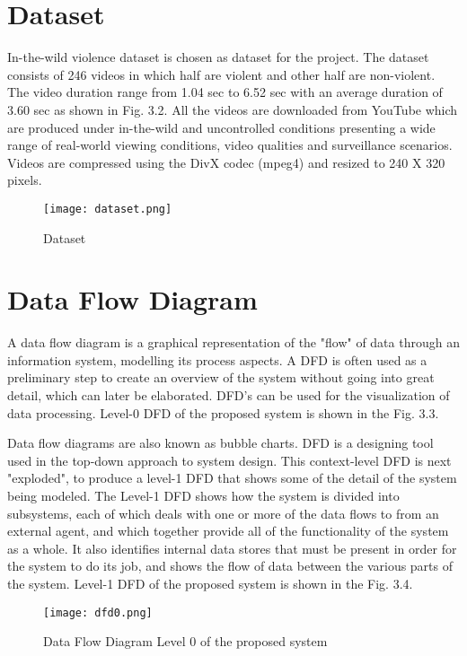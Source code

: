 \section{Dataset}
In-the-wild violence dataset is chosen as dataset for the project. The dataset consists of 246 videos in which half are violent and other half are non-violent. The video duration range from 1.04 sec to 6.52 sec with an average duration of 3.60 sec as shown in Fig. 3.2. All the videos are downloaded from YouTube which are produced under in-the-wild and uncontrolled conditions presenting a wide range of real-world viewing conditions, video qualities and surveillance scenarios. Videos are compressed using the DivX codec (mpeg4) and resized to 240 X 320 pixels.

\begin{center}
\begin{figure}[H]
\centering
\texttt{[image: dataset.png]}
\caption{Dataset}
\end{figure}
\end{center}
\section{Data Flow Diagram}
A data flow diagram is a graphical representation of the "flow" of data through an information system, modelling its process aspects. A DFD is often used as a preliminary step to create an overview of the system without going into great detail, which can later be elaborated. DFD's can be used for the visualization of data processing. Level-0 DFD of the proposed system is shown in the Fig. 3.3.
\par
Data flow diagrams are also known as bubble charts. DFD is a designing tool used in the top-down approach to system design. This context-level DFD is next "exploded", to produce a level-1 DFD that shows some of the detail of the system being modeled. The Level-1 DFD shows how the system is divided into subsystems, each of which deals with one or more of the data flows to from an external agent, and which together provide all of the functionality of the system as a whole. It also identifies internal data stores that must be present in order for the system to do its job, and shows the flow of data between the various parts of the system. Level-1 DFD of the proposed system is shown in the Fig. 3.4.

\begin{center}
\begin{figure}[H]
\centering
\texttt{[image: dfd0.png]}
\caption{Data Flow Diagram Level 0 of the proposed system}
\end{figure}
\end{center}

